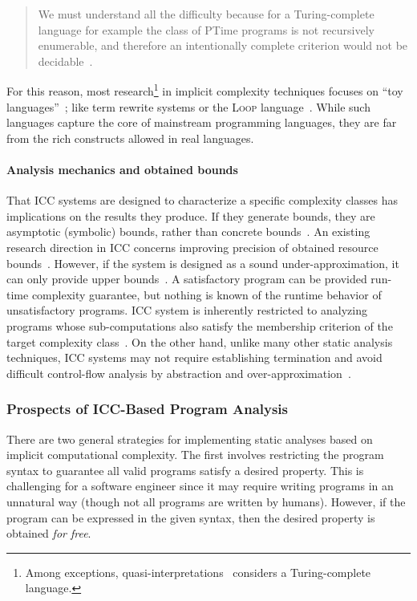 \begin{quotation}
\noindent We must understand all the diﬃculty because for a Turing-complete language for example the class of PTime programs is not recursively enumerable, and therefore an intentionally complete criterion would not be decidable~\cite[Sect. 4.1]{mogbil2012}.
\end{quotation}

\noindent For this reason, most research\footnote{
Among exceptions, quasi-interpretations~\cite{marion2000} considers a Turing-complete language.}
in implicit complexity techniques focuses on \enquote{toy languages}~\cite{moyen2017,rubiano17};
like term rewrite systems or the \textsc{Loop} language~\cite{kristiansen2005}.
While such languages capture the core of mainstream programming languages, they are far from the rich constructs allowed in real languages.

\paragraph*{Analysis mechanics and obtained bounds}
That ICC systems are designed to characterize a specific complexity classes has implications on the results they produce.
If they generate bounds, they are asymptotic (symbolic) bounds, rather than concrete bounds~\cite{baillot2019}.
An existing research direction in ICC concerns improving precision of obtained resource bounds~\cite{benamram2020}.
However, if the system is designed as a sound under-approximation, it can only provide upper bounds~\cite[p. 119]{moyen2017}.
A satisfactory program can be provided run-time complexity guarantee, but nothing is known of the runtime behavior of unsatisfactory programs.
ICC system is inherently restricted to analyzing programs whose sub-computations also satisfy the membership criterion of the target complexity class~\cite{baillot2019}.
On the other hand, unlike many other static analysis techniques,
ICC systems may not require establishing termination and avoid difficult control-flow analysis by abstraction and over-approximation~\cite{jones2009}.

\subsubsection{Prospects of ICC-Based Program Analysis}

There are two general strategies for implementing static analyses based on implicit computational complexity.
The first involves restricting the program syntax to guarantee all valid programs satisfy a desired property.
This is challenging for a software engineer since it may require writing programs in an unnatural way (though not all programs are written by humans).
However, if the program can be expressed in the given syntax, then the desired property is obtained \emph{for free}.


